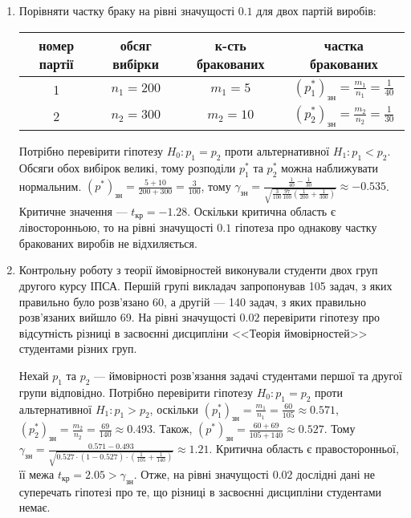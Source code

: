 \begin{example}
    \begin{enumerate}
        \item Порівняти частку браку на рівні значущості $0.1$ для двох партій виробів:
        
        \begin{center}
            \begin{tabular}{|c|c|c|c|}
                \hline
                номер партії & обсяг вибірки & к-сть бракованих & частка бракованих \\
                \hline
                1 & $n_1 = 200$ & $m_1 = 5$ & $(p_1^*)_\text{зн} = \frac{m_1}{n_1} = \frac{1}{40}$ \\ 
                \hline
                2 & $n_2 = 300$ & $m_2 = 10$ & $(p_2^*)_\text{зн} = \frac{m_2}{n_2} = \frac{1}{30}$ \\
                \hline 
            \end{tabular}
        \end{center}

        Потрібно перевірити гіпотезу $H_0: p_1 = p_2$ проти альтернативної
        $H_1: p_1 < p_2$. Обсяги обох вибірок великі, тому розподіли $p_1^*$ та
        $p_2^*$ можна наближувати нормальним. $(p^*)_\text{зн} = \frac{5 + 10}{200 + 300} = \frac{3}{100}$, тому
        $\gamma_\text{зн} = \frac{\frac{1}{40} - \frac{1}{30}}{
            \sqrt{\frac{3}{100} \frac{97}{100} \left(\frac{1}{200} + \frac{1}{300}\right)}
            } \approx -0.535$. Критичне значення --- $t_\text{кр} = -1.28$.
            Оскільки критична область є лівосторонньою, то на рівні значущості $0.1$ гіпотеза
            про однакову частку бракованих виробів не відхиляється.
            \item Контрольну роботу з теорії ймовірностей виконували студенти двох груп другого курсу ІПСА.
            Першій групі викладач запропонував 105 задач, з яких правильно було розв'язано 60, а другій --- 140 задач, з яких правильно
            розв'язаних вийшло 69. На рівні значущості $0.02$ перевірити гіпотезу про відсутність різниці в засвоєнні дисципліни 
            <<Теорія ймовірностей>> студентами різних груп.

            Нехай $p_1$ та $p_2$ --- ймовірності розв'язання задачі студентами першої та другої групи відповідно. Потрібно перевірити
            гіпотезу $H_0: p_1 = p_2$ проти альтернативної $H_1: p_1 > p_2$, оскільки
            $(p_1^*)_\text{зн} = \frac{m_1}{n_1} = \frac{60}{105} \approx 0.571$,
            $(p_2^*)_\text{зн} = \frac{m_2}{n_2} = \frac{69}{140} \approx 0.493$.
            Також, $(p^*)_\text{зн} = \frac{60 + 69}{105 + 140} \approx 0.527$.
            Тому 
            $\gamma_\text{зн} = \frac{0.571 - 0.493}{\sqrt{0.527\cdot(1-0.527)\cdot\left(\frac{1}{105} + \frac{1}{140}\right)}} \approx 1.21$.
            Критична область є правосторонньої, її межа $t_\text{кр} = 2.05 > \gamma_\text{зн}$.
            Отже, на рівні значущості $0.02$ дослідні дані не суперечать гіпотезі про те, що різниці в засвоєнні
            дисципліни студентами немає.
    \end{enumerate}
\end{example}
